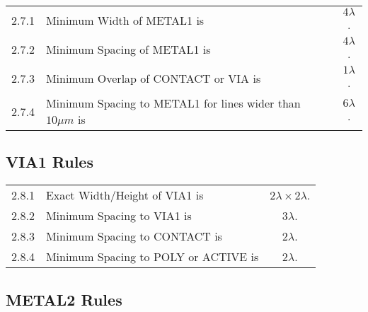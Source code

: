 \begin{flushleft}
    \begin{tabular}{c l c}
        2.7.1   & Minimum Width of METAL1 is & $4 \lambda$. \\
        2.7.2   & Minimum Spacing of METAL1 is & $4 \lambda$. \\
        2.7.3   & Minimum Overlap of CONTACT or VIA is & $1 \lambda$. \\
        2.7.4   & Minimum Spacing to METAL1 for lines wider than $10 \mu m$ is & $6 \lambda$. \\
    \end{tabular}
\end{flushleft}

\subsection{VIA1 Rules}\label{design_rules_via1_rules}

\begin{flushleft}
    \begin{tabular}{c l c}
        2.8.1   & Exact Width/Height of VIA1 is & $ 2 \lambda \times 2 \lambda$. \\
        2.8.2   & Minimum Spacing to VIA1 is & $3 \lambda$. \\
        2.8.3   & Minimum Spacing to CONTACT is & $2 \lambda$. \\
        2.8.4   & Minimum Spacing to POLY or ACTIVE is & $2 \lambda$. \\
    \end{tabular}
\end{flushleft}

\subsection{METAL2 Rules}\label{design_rules_metal2_rules}

\begin{center}
\end{center}

